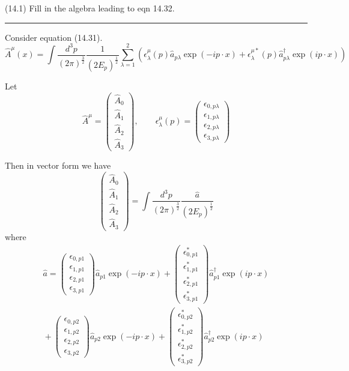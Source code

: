 \documentclass[12pt]{article}
\begin{document}
(14.1)
Fill in the algebra leading to eqn 14.32.

\bigskip
\hrule

\bigskip
Consider equation (14.31).
\begin{equation*}
\hat A^\mu(x)=\int\frac{d^3p}{(2\pi)^\frac{3}{2}}\frac{1}{(2E_p)^\frac{1}{2}}
\sum_{\lambda=1}^2
\left(
\epsilon_\lambda^\mu(p)\hat a_{p\lambda}\exp(-ip\cdot x)
+\epsilon_\lambda^{\mu*}(p)\hat a_{p\lambda}^\dag\exp(ip\cdot x)
\right)
\tag{14.31}
\end{equation*}

Let
\begin{equation*}
\hat A^\mu=\begin{pmatrix}\hat A_0\\\hat A_1\\\hat A_2\\\hat A_3\end{pmatrix},
\qquad
\epsilon_\lambda^\mu(p)=\begin{pmatrix}
\epsilon_{0,p\lambda}\\\epsilon_{1,p\lambda}\\\epsilon_{2,p\lambda}\\\epsilon_{3,p\lambda}
\end{pmatrix}
\end{equation*}

Then in vector form we have
\begin{equation*}
\begin{pmatrix}\hat A_0\\\hat A_1\\\hat A_2\\\hat A_3\end{pmatrix}
=\int\frac{d^3p}{(2\pi)^\frac{3}{2}}\frac{\hat a}{(2E_p)^\frac{1}{2}}
\end{equation*}
where
\begin{multline*}
\hat a=\begin{pmatrix}\epsilon_{0,p1}\\\epsilon_{1,p1}\\\epsilon_{2,p1}\\\epsilon_{3,p1}\end{pmatrix}
\hat a_{p1}\exp(-ip\cdot x)
+\begin{pmatrix}\epsilon_{0,p1}^*\\\epsilon_{1,p1}^*\\\epsilon_{2,p1}^*\\\epsilon_{3,p1}^*\end{pmatrix}
\hat a_{p1}^\dag\exp(ip\cdot x)
\\
{}+\begin{pmatrix}\epsilon_{0,p2}\\\epsilon_{1,p2}\\\epsilon_{2,p2}\\\epsilon_{3,p2}\end{pmatrix}
\hat a_{p2}\exp(-ip\cdot x)
+\begin{pmatrix}\epsilon_{0,p2}^*\\\epsilon_{1,p2}^*\\\epsilon_{2,p2}^*\\\epsilon_{3,p2}^*\end{pmatrix}
\hat a_{p2}^\dag\exp(ip\cdot x)
\end{multline*}
\end{document}
